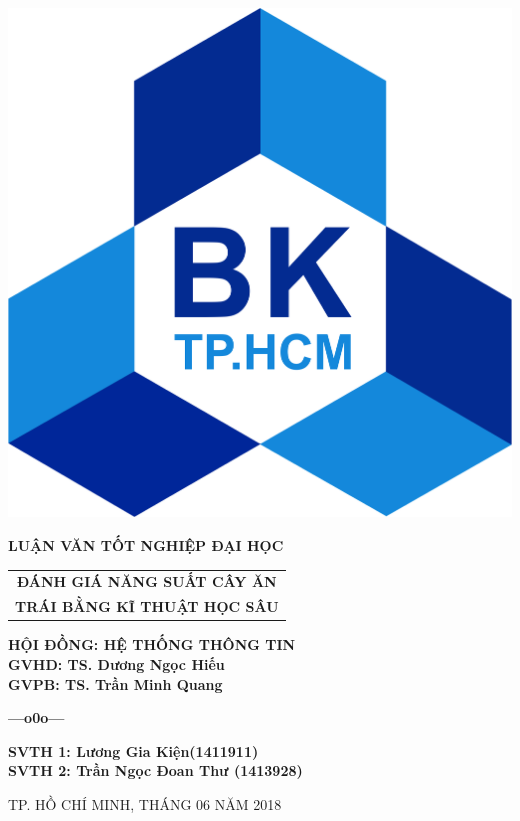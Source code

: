 \begin{titlepage}
\vspace{0.4cm}
\begin{center}
\includegraphics[scale=0.25]{hcmut.png}\\[1cm]
\end{center}
\vspace{-0.75cm}
\begin{center}
\large 
	\bfseries LUẬN VĂN TỐT NGHIỆP ĐẠI HỌC \\
\end{center}
\vspace{-1.25cm}
\begin{center}
\Huge
	\begin{tabular}{@{}c}
		\bfseries{ĐÁNH GIÁ NĂNG SUẤT CÂY ĂN } \\ 
		\bfseries{TRÁI BẰNG KĨ THUẬT HỌC SÂU} \\[0.5cm]
	\end{tabular}
\end{center}
	
\hspace{4.5cm}	
\begin{minipage}[t]{0.7\linewidth}
\large
	\textbf{HỘI ĐỒNG: HỆ THỐNG THÔNG TIN}\\ [0.5cm]
	\textbf{GVHD: TS. Dương Ngọc Hiếu}\\ [0.5cm]
	\textbf{GVPB: TS. Trần Minh Quang}\\
	\vspace{-0.7cm}
	\begin{center}
	\textbf{---o0o---}
	\end{center}
	\textbf{SVTH 1: Lương Gia Kiện(1411911)}\\ [0.5cm]
	\textbf{SVTH 2: Trần Ngọc Đoan Thư (1413928)}\\
\end{minipage}

\vfill
\centerline{\large{TP. HỒ CHÍ MINH, THÁNG 06 NĂM 2018}}
\end{titlepage}
